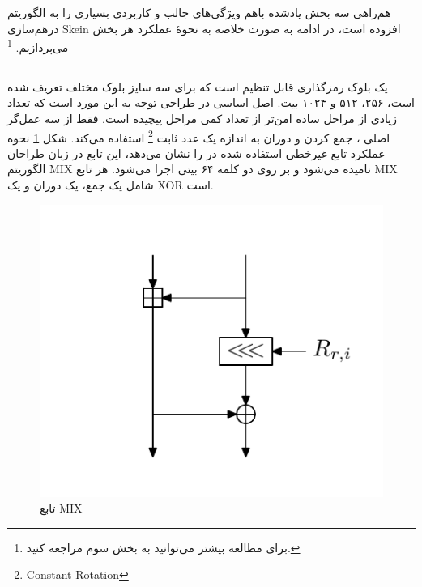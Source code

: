 هم‌راهی سه بخش یادشده باهم ویژگی‌های جالب و کاربردی بسیاری را به الگوریتم درهم‌سازی 
Skein 
افزوده است، در ادامه به صورت خلاصه به نحوهٔ عملکرد هر بخش می‌پردازیم.
\footnote{برای مطالعه بیشتر می‌توانید به بخش سوم 
\cite{main_doc} مراجعه کنید. }
\subsection{}
یک بلوک رمزگذاری قابل تنظیم است که برای سه سایز بلوک مختلف تعریف شده است، ۲۵۶، ۵۱۲ و ۱۰۲۴ بیت. 
اصل اساسی در طراحی 
توجه به این مورد است که تعداد زیادی از مراحل ساده امن‌تر از تعداد کمی مراحل پیچیده است.
فقط از سه عمل‌گر اصلی 
، جمع کردن و دوران به اندازه یک عدد ثابت
\footnote{Constant Rotation}
استفاده می‌کند. 
شکل 
\ref{threefish_mix_function}
نحوه عملکرد تابع غیرخطی استفاده شده در 
را نشان می‌دهد، این تابع در زبان طراحان الگوریتم 
MIX
نامیده می‌شود و بر روی دو کلمه ۶۴ بیتی اجرا می‌شود. هر تابع 
MIX
شامل یک جمع، یک دوران و یک 
XOR
است. 
\begin{figure}
\centering
\includegraphics[scale=0.7]{figs/threefish_mix_function.png}
\caption{تابع MIX}
\label{threefish_mix_function}
\end{figure}


\begin{thebibliography}{1}


  
  
\end{thebibliography}
